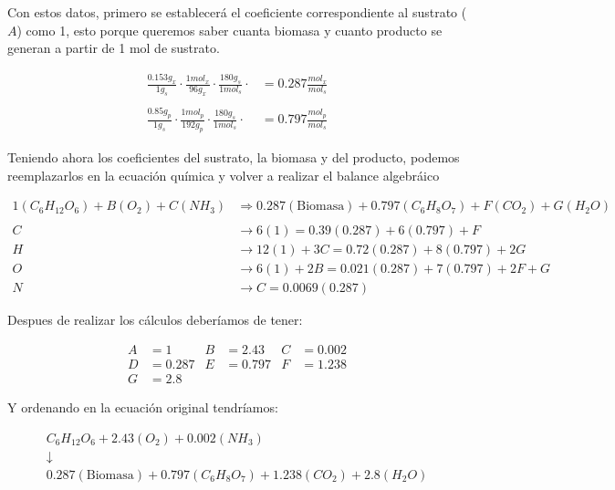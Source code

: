 Con estos datos, primero se establecerá el coeficiente correspondiente al sustrato ($A$) como 1, esto porque queremos saber cuanta biomasa y cuanto producto se generan a partir de 1 mol de sustrato.

\begin{align*}
    \frac{0.153g_{x}}{1g_{s}} \cdot \frac{1mol_{x}}{96g_{x}} \cdot \frac{180g_{s}}{1mol_{s}} \cdot &= 0.287\frac{mol_{x}}{mol_{s}}
    \\
    \\
    \frac{0.85g_{p}}{1g_{s}} \cdot \frac{1mol_{p}}{192g_{p}} \cdot \frac{180g_{s}}{1mol_{s}} \cdot &= 0.797\frac{mol_{p}}{mol_{s}}
\end{align*}

Teniendo ahora los coeficientes del sustrato, la biomasa y del producto, podemos reemplazarlos en la ecuación química y volver a realizar el balance algebráico

\begin{align*}
    1(C_{6}H_{12}O_{6}) + B(O_{2}) + C(NH_{3}) &\Longrightarrow 0.287(\text{Biomasa}) + 0.797(C_{6}H_{8}O_{7}) + F(CO_{2}) + G(H_{2}O)
    \\
    \\
    C &\longrightarrow 6(1) = 0.39(0.287) + 6(0.797) + F
    \\
    H &\longrightarrow 12(1) + 3C = 0.72(0.287) + 8(0.797) + 2G
    \\
    O &\longrightarrow 6(1) + 2B = 0.021(0.287) + 7(0.797) + 2F + G
    \\
    N &\longrightarrow C = 0.0069(0.287)
\end{align*}

Despues de realizar los cálculos deberíamos de tener:

\begin{align*}
    A&=1     & B&=2.43  & C&=0.002
    \\
    D&=0.287 & E&=0.797 & F&=1.238
    \\
    G&=2.8
\end{align*}

Y ordenando en la ecuación original tendríamos:

\begin{gather*}
    C_{6}H_{12}O_{6} + 2.43(O_{2}) + 0.002(NH_{3})
    \\
    \downarrow
    \\
    0.287(\text{Biomasa}) + 0.797(C_{6}H_{8}O_{7}) + 1.238(CO_{2}) + 2.8(H_{2}O)
\end{gather*}